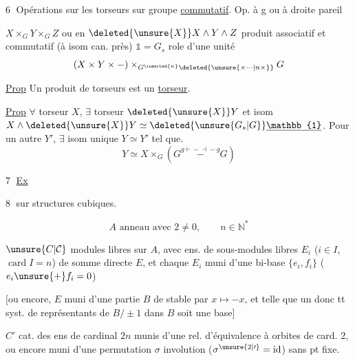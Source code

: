 \textcircled{6} Opérations  sur les torseurs sur groupe \uline{commutatif}. Op. à g ou à droite pareil

$X\times_G Y\times_G Z$ ou en $\deleted{\unsure{X}}X\wedge Y\wedge Z$ produit associatif et commutatif (à isom can. près) $\mathbb{1}=G_s$  role d'une unité
\[
 (X\times Y\times-)\times_{G^{\inserted{n}}\deleted{\unsure{\times\cdots|n\times}}}G
\]

\uline{Prop} Un produit de torseurs est un \uline{torseur}.


\uline{Prop} $\forall$ torseur $X$, $\exists$ torseur $\deleted{\unsure{X}}Y$ et isom $X\wedge\deleted{\unsure{X}}Y\simeq\deleted{\unsure{G_s|G}}\underline{\mathbb{1}}$. Pour un autre $Y'$, $\exists$ isom unique $Y\simeq Y'$ tel que.
\[
 Y\simeq X\times_G(G\overset{g\mathrel{\vdash\!-\!\dashv}-g}{\mathrel{-}}G)
\]

\textcircled{7} \uline{Ex}  


\textcircled{8}  sur structures cubiques.

\[
 A\text{ anneau avec }2\ne0,\qquad n\in\mathbb{N}^{*}
\]

$\unsure{C|\mathcal{C}}$  modules libres  sur $A$, avec  ens. de  sous-modules libres $E_i$ ($i\in I$, $\operatorname{card} I=n$) de somme directe $E$, et chaque $E_i$ muni d'une bi-base $\{e_i,f_i\}$ ($e_i\unsure{+}f_i=0$)

[ou encore, $E$ muni d'une partie $B$ de  stable par $x\longmapsto-x$, et telle que un \textendash{} donc tt \textendash{} syst. de représentants de $B/\pm1$ dans $B$ soit une base]

\diagram{\begin{tikzcd}[ampersand replacement=\&,row sep=small]
 {}\arrow[d,"\wr"']\\ {}
\end{tikzcd}}
$C'$ cat. des ens  de cardinal $2n$ munis d'une rel. d'équivalence  à orbites de card. $2$, ou encore muni d'une permutation $\sigma$ involution ($\sigma^{\unsure{2|\prime}}=\mathrm{id}$) sans pt fixe.

